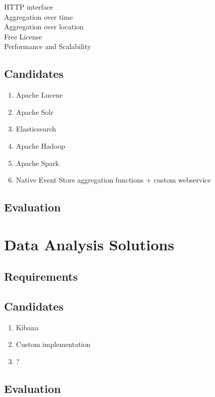 \begin{description}
\item [HTTP interface]
\item [Aggregation over time]
\item [Aggregation over location]
\item [Free License]
\item [Performance and Scalability]
\end{description}

\subsection{Candidates}

\begin{enumerate}
\item Apache Lucene
\item Apache Solr
\item Elasticsearch
\item Apache Hadoop
\item Apache Spark
\item Native Event Store aggregation functions + custom webservice
\end{enumerate}

\subsection{Evaluation}

\section{Data Analysis Solutions}
\label{sec:system:analysis}

\subsection{Requirements}

\subsection{Candidates}

\begin{enumerate}
\item Kibana
\item Custom implementation
\item ?
\end{enumerate}

\subsection{Evaluation}